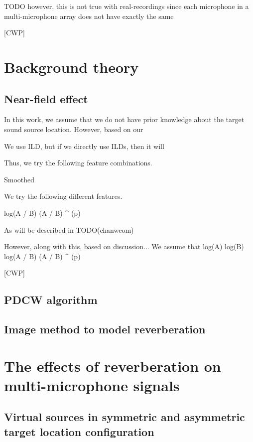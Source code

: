 \documentclass[journal]{IEEEtran}
\begin{document}
TODO
however, this is not true with real-recordings since each microphone
in a multi-microphone array does not have exactly the same  



[CWP]


%
\section{Background theory}

\subsection {Near-field effect}

In this work, we assume that we do not have prior knowledge about the
target sound source location. However, based on our

We use ILD, but if we directly use ILDs, then it will 

Thus, we try the following feature combinations.

Smoothed 

We try the following different features.

log(A / B)
(A / B) ^ (p)

As will be described in TODO(chanwcom) 

However, along with this, based on discussion... We assume that
log(A) log(B)
log(A / B)
(A / B) ^ (p)


[CWP]

\subsection {PDCW algorithm}

\subsection {Image method to model reverberation}

%
\section{The effects of reverberation on multi-microphone signals}


\subsection{Virtual sources in symmetric and asymmetric target location configuration}
\end{document}
